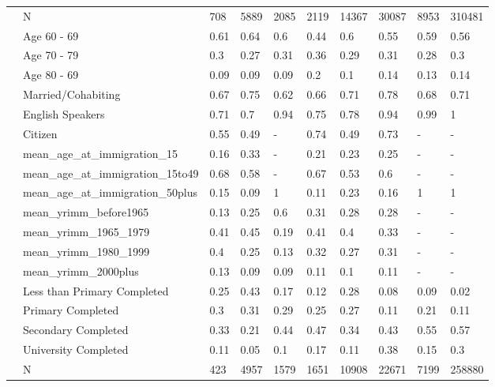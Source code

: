 \begin{table}[ht]
\begin{tabular}{l|l|llllllll}
   & N & 708 & 5889 & 2085 & 2119 & 14367 & 30087 & 8953 & 310481 \\ 
   & Age 60 - 69 & 0.61 & 0.64 & 0.6 & 0.44 & 0.6 & 0.55 & 0.59 & 0.56 \\ 
   & Age 70 - 79 & 0.3 & 0.27 & 0.31 & 0.36 & 0.29 & 0.31 & 0.28 & 0.3 \\ 
   & Age 80 - 69 & 0.09 & 0.09 & 0.09 & 0.2 & 0.1 & 0.14 & 0.13 & 0.14 \\ 
   & Married/Cohabiting & 0.67 & 0.75 & 0.62 & 0.66 & 0.71 & 0.78 & 0.68 & 0.71 \\ 
   & English Speakers & 0.71 & 0.7 & 0.94 & 0.75 & 0.78 & 0.94 & 0.99 & 1 \\ 
   & Citizen & 0.55 & 0.49 & - & 0.74 & 0.49 & 0.73 & - & - \\ 
   & mean\_age\_at\_immigration\_15 & 0.16 & 0.33 & - & 0.21 & 0.23 & 0.25 & - & - \\ 
   & mean\_age\_at\_immigration\_15to49 & 0.68 & 0.58 & - & 0.67 & 0.53 & 0.6 & - & - \\ 
   & mean\_age\_at\_immigration\_50plus & 0.15 & 0.09 & 1 & 0.11 & 0.23 & 0.16 & 1 & 1 \\ 
   & mean\_yrimm\_before1965 & 0.13 & 0.25 & 0.6 & 0.31 & 0.28 & 0.28 & - & - \\ 
   & mean\_yrimm\_1965\_1979 & 0.41 & 0.45 & 0.19 & 0.41 & 0.4 & 0.33 & - & - \\ 
   & mean\_yrimm\_1980\_1999 & 0.4 & 0.25 & 0.13 & 0.32 & 0.27 & 0.31 & - & - \\ 
   & mean\_yrimm\_2000plus & 0.13 & 0.09 & 0.09 & 0.11 & 0.1 & 0.11 & - & - \\ 
   & Less than Primary Completed & 0.25 & 0.43 & 0.17 & 0.12 & 0.28 & 0.08 & 0.09 & 0.02 \\ 
   & Primary Completed & 0.3 & 0.31 & 0.29 & 0.25 & 0.27 & 0.11 & 0.21 & 0.11 \\ 
   & Secondary Completed & 0.33 & 0.21 & 0.44 & 0.47 & 0.34 & 0.43 & 0.55 & 0.57 \\ 
   & University Completed & 0.11 & 0.05 & 0.1 & 0.17 & 0.11 & 0.38 & 0.15 & 0.3 \\ 
   & N & 423 & 4957 & 1579 & 1651 & 10908 & 22671 & 7199 & 258880 \\ 
   \hline
\end{tabular}
\endgroup
\end{table}

